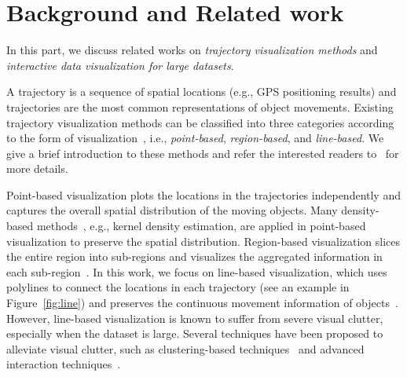 \section{Background and Related work}\label{sec:rel}

In this part, we discuss related works on \textit{trajectory visualization methods} and \textit{interactive data visualization for large datasets}.

A trajectory is a sequence of spatial locations (e.g., GPS positioning results) and trajectories are the most common representations of object movements. Existing trajectory visualization methods can be classified into three categories according to the form of visualization~\cite{chen2015survey}, i.e., \textit{point-based}, \textit{region-based}, and \textit{line-based}. We give a brief introduction to these methods and refer the interested readers to~\cite{chen2015survey} for more details.


Point-based visualization plots the locations in the trajectories independently and captures the overall spatial distribution of the moving objects. Many density-based methods~\cite{liu2013vait,yang2016exploring,chae2014public,borruso2008network}, e.g., kernel density estimation, are applied in point-based visualization to preserve the spatial distribution. Region-based visualization slices the entire region into sub-regions and visualizes the aggregated information in each sub-region~\cite{guo2009flow,von2015mobilitygraphs}.
In this work, we focus on line-based visualization, which uses polylines to connect the locations in each trajectory (see an example in Figure~\ref{fig:line}) and preserves the continuous movement information of objects~\cite{guo2011tripvista,hurter2009fromdady}. However, line-based visualization is known to suffer from severe visual clutter, especially when the dataset is large. Several techniques have been proposed to alleviate visual clutter, such as clustering-based techniques~\cite{von2015mobilitygraphs} and advanced interaction techniques~\cite{ferreira2013visual}.

